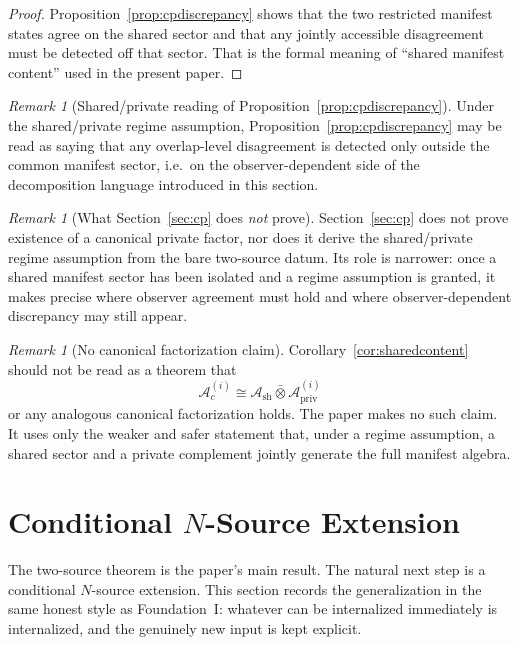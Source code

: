 \documentclass[12pt]{article}
\theoremstyle{definition}
\theoremstyle{remark}
\newtheorem{remark}[theorem]{Remark}
\begin{document}
\begin{proof}
Proposition~\ref{prop:cpdiscrepancy} shows that the two restricted
manifest states agree on the shared sector and that any jointly
accessible disagreement must be detected off that sector. That is the
formal meaning of ``shared manifest content'' used in the present paper.
\end{proof}

\begin{remark}[Shared/private reading of Proposition~\ref{prop:cpdiscrepancy}]
Under the shared/private regime assumption, Proposition~\ref{prop:cpdiscrepancy}
may be read as saying that any overlap-level disagreement is detected
only outside the common manifest sector, i.e.\ on the observer-dependent
side of the decomposition language introduced in this section.
\end{remark}

\begin{remark}[What Section~\ref{sec:cp} does \emph{not} prove]
Section~\ref{sec:cp} does not prove existence of a canonical private
factor, nor does it derive the shared/private regime assumption from the
bare two-source datum. Its role is narrower: once a shared manifest
sector has been isolated and a regime assumption is granted, it makes
precise where observer agreement must hold and where observer-dependent
discrepancy may still appear.
\end{remark}

\begin{remark}[No canonical factorization claim]
Corollary~\ref{cor:sharedcontent} should not be read as a theorem that
\[
\mathcal A_c^{(i)}
\cong
\mathcal A_{\mathrm{sh}}\bar\otimes
\mathcal A_{\mathrm{priv}}^{(i)}
\]
or any analogous canonical factorization holds. The paper makes no such
claim. It uses only the weaker and safer statement that, under a regime
assumption, a shared sector and a private complement jointly generate
the full manifest algebra.
\end{remark}

\section{Conditional \texorpdfstring{$N$}{N}-Source Extension}\label{sec:nsource}

The two-source theorem is the paper's main result. The natural next step
is a conditional \(N\)-source extension. This section records the
generalization in the same honest style as Foundation~I: whatever can be
internalized immediately is internalized, and the genuinely new input is
kept explicit.
\end{document}
